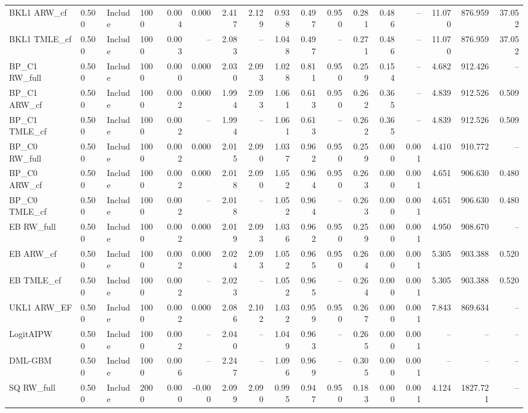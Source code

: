 \begin{tabular}{llllrrrrrrrrrrrrr}
BKL1 ARW\_cf & 0.500 & Include & 1000 & 0.004 & 0.000 & 2.417 & 2.129 & 0.938 & 0.497 & 0.950 & 0.281 & 0.486 & -- & 11.070 & 876.959 & 37.052 \\
BKL1 TMLE\_cf & 0.500 & Include & 1000 & 0.003 & -- & 2.083 & -- & 1.048 & 0.497 & -- & 0.271 & 0.486 & -- & 11.070 & 876.959 & 37.052 \\
BP\_C1 RW\_full & 0.500 & Include & 1000 & 0.000 & 0.000 & 2.030 & 2.093 & 1.028 & 0.811 & 0.950 & 0.259 & 0.154 & -- & 4.682 & 912.426 & -- \\
BP\_C1 ARW\_cf & 0.500 & Include & 1000 & 0.002 & 0.000 & 1.994 & 2.093 & 1.061 & 0.613 & 0.950 & 0.262 & 0.365 & -- & 4.839 & 912.526 & 0.509 \\
BP\_C1 TMLE\_cf & 0.500 & Include & 1000 & 0.002 & -- & 1.994 & -- & 1.061 & 0.613 & -- & 0.262 & 0.365 & -- & 4.839 & 912.526 & 0.509 \\
BP\_C0 RW\_full & 0.500 & Include & 1000 & 0.002 & 0.000 & 2.015 & 2.090 & 1.037 & 0.962 & 0.950 & 0.259 & 0.000 & 0.001 & 4.410 & 910.772 & -- \\
BP\_C0 ARW\_cf & 0.500 & Include & 1000 & 0.002 & 0.000 & 2.018 & 2.090 & 1.052 & 0.964 & 0.950 & 0.263 & 0.000 & 0.001 & 4.651 & 906.630 & 0.480 \\
BP\_C0 TMLE\_cf & 0.500 & Include & 1000 & 0.002 & -- & 2.018 & -- & 1.052 & 0.964 & -- & 0.263 & 0.000 & 0.001 & 4.651 & 906.630 & 0.480 \\
EB RW\_full & 0.500 & Include & 1000 & 0.002 & 0.000 & 2.019 & 2.093 & 1.036 & 0.962 & 0.950 & 0.259 & 0.000 & 0.001 & 4.950 & 908.670 & -- \\
EB ARW\_cf & 0.500 & Include & 1000 & 0.002 & 0.000 & 2.024 & 2.093 & 1.052 & 0.965 & 0.950 & 0.264 & 0.000 & 0.001 & 5.305 & 903.388 & 0.520 \\
EB TMLE\_cf & 0.500 & Include & 1000 & 0.002 & -- & 2.023 & -- & 1.052 & 0.965 & -- & 0.264 & 0.000 & 0.001 & 5.305 & 903.388 & 0.520 \\
UKL1 ARW\_EF & 0.500 & Include & 1000 & 0.002 & 0.000 & 2.086 & 2.102 & 1.032 & 0.959 & 0.950 & 0.267 & 0.000 & 0.001 & 7.843 & 869.634 & -- \\
LogitAIPW & 0.500 & Include & 1000 & 0.002 & -- & 2.040 & -- & 1.049 & 0.963 & -- & 0.265 & 0.000 & 0.001 & -- & -- & -- \\
DML-GBM & 0.500 & Include & 1000 & 0.006 & -- & 2.247 & -- & 1.096 & 0.969 & -- & 0.305 & 0.000 & 0.001 & -- & -- & -- \\
SQ RW\_full & 0.500 & Include & 2000 & 0.000 & -0.000 & 2.099 & 2.090 & 0.995 & 0.947 & 0.950 & 0.183 & 0.000 & 0.001 & 4.124 & 1827.721 & -- \\

\end{tabular}
